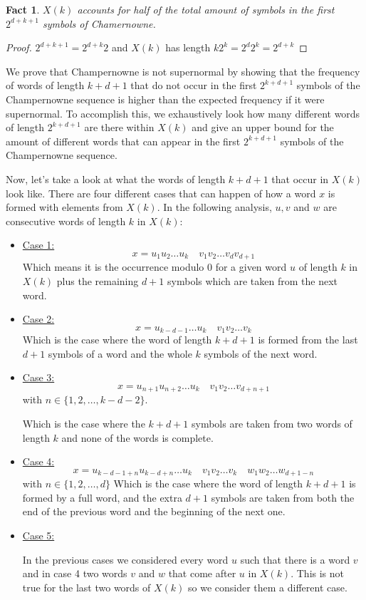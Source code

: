 \documentclass[11pt,a4paper]{tesis}
\newtheorem{fact}{Fact}[section]
\theoremstyle{definition}
\begin{document}
\begin{fact} \label{p2}
    $X(k)$ accounts for half of the total amount of symbols in the first $2^{d+k+1}$ symbols of Chamernowne.
\end{fact}
\begin{proof}
    $2^{d+k+1} = 2^{d+k}2$ and $X(k)$ has length $k2^k = 2^d2^k = 2^{d+k}$ 
\end{proof}

We prove that Champernowne is not supernormal by showing that the frequency of words of length $k+d+1$ that do not occur in the first $2^{k+d+1}$ symbols of the Champernowne sequence is higher than the expected frequency if it were supernormal.
To accomplish this, we exhaustively look how many different words of length $2^{k+d+1}$ are there within $X(k)$ and give an upper bound for the amount of different words that can appear in the first $2^{k+d+1}$ symbols of the Champernowne sequence.

Now, let's take a look at what the words of length $k + d + 1$ that occur in $X(k)$ look like. There are four different cases that can happen of how a word $x$ is formed with elements from $X(k)$. 
In the following analysis, $u, v$ and $w$ are consecutive words of length $k$ in $X(k)$:

\begin{itemize}
  \item \underline{Case 1:} 
  $$x = u_1 u_2 \dots u_k \quad v_1 v_2 \dots v_{d} v_{d + 1}$$
    Which means it is the occurrence modulo 0 for a given word $u$ of length $k$ in $X(k)$ plus the remaining $d + 1$ symbols which are taken from the next word.

  \item \underline{Case 2:} 
  $$ x = u_{k-d-1} \dots u_k \quad v_1 v_2 \dots v_k$$
  Which is the case where the word of length $k + d + 1$ is formed from the last $d + 1$ symbols of a word and the whole $k$ symbols of the next word.

  \item \underline{Case 3:} 
  $$x = u_{n+1} u_{n+2} \dots u_k \quad  v_1 v_2 \dots v_{d+n+1} $$
with $n \in \{1,2,\dots ,k - d - 2\}$.

   Which is the case where the $k + d + 1$ symbols are taken from two words of length $k$ and none of the words is complete.

  
  \item \underline{Case 4:} 
  $$ x = u_{k-d-1+n} u_{k-d+n} \dots u_k \quad v_1 v_2 \dots v_k \quad w_1 w_2 \dots w_{d+1-n}$$
  with $n \in \{1, 2, \dots , d\}$
  Which is the case where the word of length $k + d + 1$ is formed by a full word, and the extra $d + 1$ symbols are taken from both the end of the previous word and the beginning of the next one.

  \item \underline{Case 5:} 
  
   In the previous cases we considered every word $u$ such that there is a word $v$ and in case 4 two words $v$ and $w$ that come after $u$ in $X(k)$. This is not true for the last two words of $X(k)$ so we consider them a different case.
  

\end{itemize}
\end{document}
